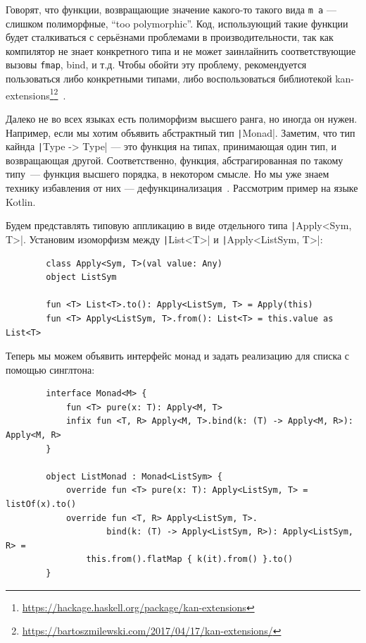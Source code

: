 \documentclass[12pt]{article}
\begin{document}
    Говорят, что функции, возвращающие значение какого-то такого вида \texttt{m a} --- слишком полиморфные, ``too polymorphic''.
    Код, использующий такие функции будет сталкиваться с серьёзнами проблемами в производительности, так как компилятор не знает конкретного типа и не может заинлайнить соответствующие вызовы \texttt{fmap}, bind, и т.д.
    Чтобы обойти эту проблему, рекомендуется пользоваться либо конкретными типами, либо воспользоваться библиотекой kan-extensions\footnote{\url{https://hackage.haskell.org/package/kan-extensions}}\footnote{\url{https://bartoszmilewski.com/2017/04/17/kan-extensions/}}~\cite[параграф 13.5]{maguire-types}.

    Далеко не во всех языках есть полиморфизм высшего ранга, но иногда он нужен.
    Например, если мы хотим объявить абстрактный тип \texttt|Monad|.
    Заметим, что тип кайнда \texttt|Type -> Type| --- это функция на типах, принимающая один тип, и возвращающая другой.
    Соответственно, функция, абстрагированная по такому типу~--- функция высшего порядка, в некотором смысле.
    Но мы уже знаем технику избавления от них --- дефункцинализация~\cite{defunctionalization-slides}.
    Рассмотрим пример на языке Kotlin.

    Будем представлять типовую аппликацию в виде отдельного типа \texttt|Apply<Sym, T>|.
    Установим изоморфизм между \texttt|List<T>| и \texttt|Apply<ListSym, T>|:
    \begin{verbatim}
        class Apply<Sym, T>(val value: Any)
        object ListSym

        fun <T> List<T>.to(): Apply<ListSym, T> = Apply(this)
        fun <T> Apply<ListSym, T>.from(): List<T> = this.value as List<T>
    \end{verbatim}

    Теперь мы можем объявить интерфейс монад и задать реализацию для списка с помощью синглтона:
    \begin{verbatim}
        interface Monad<M> {
            fun <T> pure(x: T): Apply<M, T>
            infix fun <T, R> Apply<M, T>.bind(k: (T) -> Apply<M, R>): Apply<M, R>
        }

        object ListMonad : Monad<ListSym> {
            override fun <T> pure(x: T): Apply<ListSym, T> = listOf(x).to()
            override fun <T, R> Apply<ListSym, T>.
                    bind(k: (T) -> Apply<ListSym, R>): Apply<ListSym, R> =
                this.from().flatMap { k(it).from() }.to()
        }
    \end{verbatim}
\end{document}
